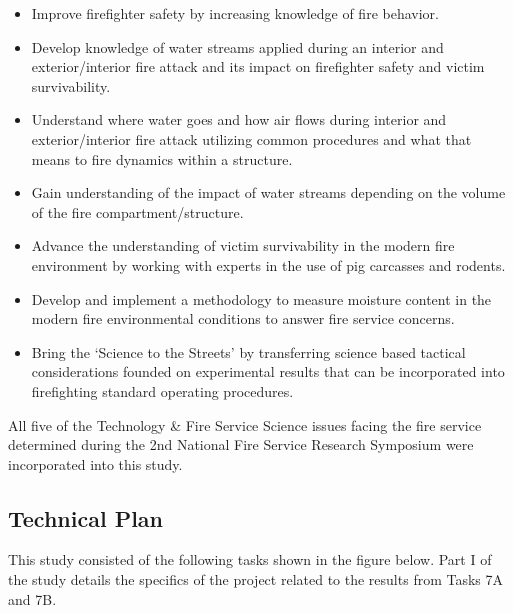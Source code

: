 \documentclass{article}
\begin{document}
\begin{itemize}
	\item Improve firefighter safety by increasing knowledge of fire behavior.
	\item Develop knowledge of water streams applied during an interior and exterior/interior fire attack and its impact on firefighter safety and victim survivability.
	\item Understand where water goes and how air flows during interior and exterior/interior fire attack utilizing common procedures and what that means to fire dynamics within a structure.
	\item Gain understanding of the impact of water streams depending on the volume of the fire compartment/structure.
	\item Advance the understanding of victim survivability in the modern fire environment by working with experts in the use of pig carcasses and rodents.
	\item Develop and implement a methodology to measure moisture content in the modern fire environmental conditions to answer fire service concerns.
	\item Bring the `Science to the Streets' by transferring science based tactical considerations founded on experimental results that can be incorporated into firefighting standard operating procedures.
	\end{itemize}

All five of the Technology \& Fire Service Science issues facing the fire service determined during the 2nd National Fire Service Research Symposium \cite{NFFF} were incorporated into this study.

\clearpage

\subsection{Technical Plan}

This study consisted of the following tasks shown in the figure below. Part I of the study details the specifics of the project related to the results from Tasks 7A and 7B. 
\end{document}

